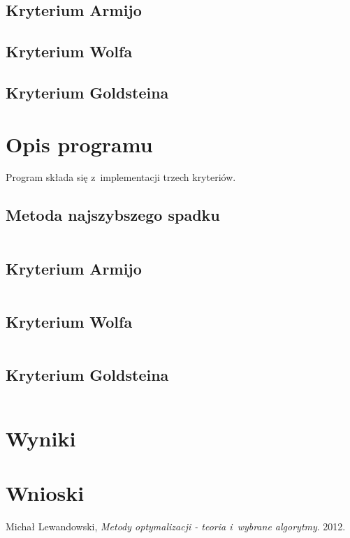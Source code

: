 \documentclass{classrep}
\begin{document}
\subsection{Kryterium Armijo}

\subsection{Kryterium Wolfa}

\subsection{Kryterium Goldsteina}


\section{Opis programu}
Program składa się z~implementacji trzech kryteriów.

\subsection{Metoda najszybszego spadku}
\begin{lstlisting}
\end{lstlisting}

\subsection{Kryterium Armijo}
\begin{lstlisting}
\end{lstlisting}

\subsection{Kryterium Wolfa}
\begin{lstlisting}
\end{lstlisting}

\subsection{Kryterium Goldsteina}
\begin{lstlisting}
\end{lstlisting}

\section{Wyniki}
	
\section{Wnioski}

\begin{thebibliography}{9}
	Michał Lewandowski,  \emph{Metody optymalizacji - teoria i~wybrane algorytmy}.  2012.
\end{thebibliography}
\end{document}
